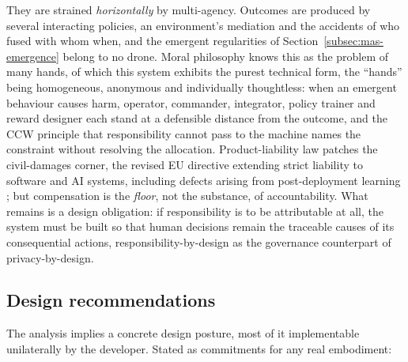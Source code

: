 They are strained \emph{horizontally} by multi-agency. Outcomes are produced by
several interacting policies, an environment's mediation and the accidents of who
fused with whom when, and the emergent regularities of
Section~\ref{subsec:mas-emergence} belong to no drone. Moral philosophy knows
this as the problem of many hands, of which this system exhibits the purest
technical form, the ``hands'' being homogeneous, anonymous and individually
thoughtless: when an emergent behaviour causes harm, operator, commander,
integrator, policy trainer and reward designer each stand at a defensible
distance from the outcome, and the CCW principle that responsibility cannot pass
to the machine \citep{ccw2019guiding} names the constraint without resolving the
allocation. Product-liability law patches the civil-damages corner, the revised
EU directive extending strict liability to software and AI systems, including
defects arising from post-deployment learning \citep{pld2024}; but compensation
is the \emph{floor}, not the substance, of accountability. What remains is a
design obligation: if responsibility is to be attributable at all, the system
must be built so that human decisions remain the traceable causes of its
consequential actions, responsibility-by-design as the governance counterpart of
privacy-by-design.

\subsection{Design recommendations}
\label{subsec:eth-recommendations}

The analysis implies a concrete design posture, most of it implementable
unilaterally by the developer. Stated as commitments for any real embodiment:

